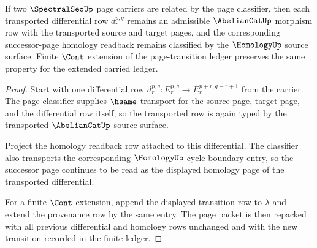\begin{theorem}
\label{thm:spectralseq-differential-ledger}
If two $\SpectralSeqUp$ page carriers are related by the page classifier, then
each transported differential row $d_r^{p,q}$ remains an admissible
$\AbelianCatUp$ morphism row with the transported source and target pages, and
the corresponding successor-page homology readback remains classified by the
$\HomologyUp$ source surface. Finite $\Cont$ extension of the page-transition
ledger preserves the same property for the extended carried ledger.
\end{theorem}
\begin{proof}
Start with one differential row
$d_r^{p,q}:E_r^{p,q}\to E_r^{p+r,q-r+1}$ from the carrier. The page
classifier supplies $\hsame$ transport for the source page, target page, and
the differential row itself, so the transported row is again typed by the
transported $\AbelianCatUp$ source surface.

Project the homology readback row attached to this differential. The
classifier also transports the corresponding $\HomologyUp$ cycle-boundary
entry, so the successor page continues to be read as the displayed homology
page of the transported differential.

For a finite $\Cont$ extension, append the displayed transition row to
$\lambda$ and extend the provenance row by the same entry. The page packet is
then repacked with all previous differential and homology rows unchanged and
with the new transition recorded in the finite ledger.
\end{proof}

